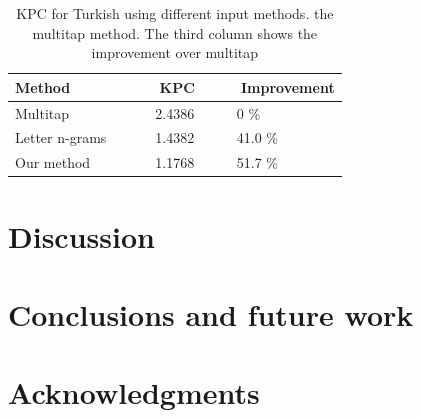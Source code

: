 \documentclass{llncs}
\begin{document}
\begin{table}
\caption{KPC for Turkish using different input methods. the multitap
  method. The third column shows the improvement over
  multitap}\label{Turkish-kpc-table}
\begin{center}
\begin{tabular}{lll}
\hline
Method &~~~~KPC &~~~~Improvement\\
\hline
Multitap                          &~~~~2.4386 &~~~~0 \%\\
Letter n-grams~\cite{Tantug:2010} &~~~~1.4382 &~~~~41.0 \%\\
Our method                        &~~~~1.1768 &~~~~51.7 \%\\
\hline
\end{tabular}
\end{center}
\end{table}

\section{Discussion}\label{discussion}

\section{Conclusions and future work}\label{conclusion}

\section{Acknowledgments}



\end{document}
